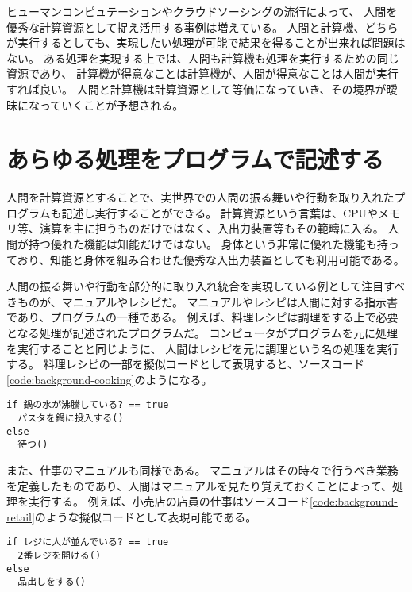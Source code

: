 ヒューマンコンピュテーションやクラウドソーシングの流行によって、
人間を優秀な計算資源として捉え活用する事例は増えている。
人間と計算機、どちらが実行するとしても、実現したい処理が可能で結果を得ることが出来れば問題はない。
ある処理を実現する上では、人間も計算機も処理を実行するための同じ資源であり、
計算機が得意なことは計算機が、人間が得意なことは人間が実行すれば良い。
人間と計算機は計算資源として等価になっていき、その境界が曖昧になっていくことが予想される。

\section{あらゆる処理をプログラムで記述する}\label{ux3042ux3089ux3086ux308bux51e6ux7406ux3092ux30d7ux30edux30b0ux30e9ux30e0ux3067ux8a18ux8ff0ux3059ux308b}

人間を計算資源とすることで、実世界での人間の振る舞いや行動を取り入れたプログラムも記述し実行することができる。
計算資源という言葉は、CPUやメモリ等、演算を主に担うものだけではなく、入出力装置等もその範疇に入る。
人間が持つ優れた機能は知能だけではない。
身体という非常に優れた機能も持っており、知能と身体を組み合わせた優秀な入出力装置としても利用可能である。

人間の振る舞いや行動を部分的に取り入れ統合を実現している例として注目すべきものが、マニュアルやレシピだ。
マニュアルやレシピは人間に対する指示書であり、プログラムの一種である。
例えば、料理レシピは調理をする上で必要となる処理が記述されたプログラムだ。
コンピュータがプログラムを元に処理を実行することと同じように、
人間はレシピを元に調理という名の処理を実行する。
料理レシピの一部を擬似コードとして表現すると、ソースコード\ref{code:background-cooking}のようになる。

\begin{lstlisting}[caption=料理レシピの一部を擬似コードで表す, label=code:background-cooking]
if 鍋の水が沸騰している? == true
  パスタを鍋に投入する()
else
  待つ()
\end{lstlisting}

また、仕事のマニュアルも同様である。
マニュアルはその時々で行うべき業務を定義したものであり、人間はマニュアルを見たり覚えておくことによって、処理を実行する。
例えば、小売店の店員の仕事はソースコード\ref{code:background-retail}のような擬似コードとして表現可能である。

\begin{lstlisting}[caption=小売店の店員の挙動の一部を擬似コードで表す, label=code:background-retail]
if レジに人が並んでいる? == true
  2番レジを開ける()
else
  品出しをする()
\end{lstlisting}

